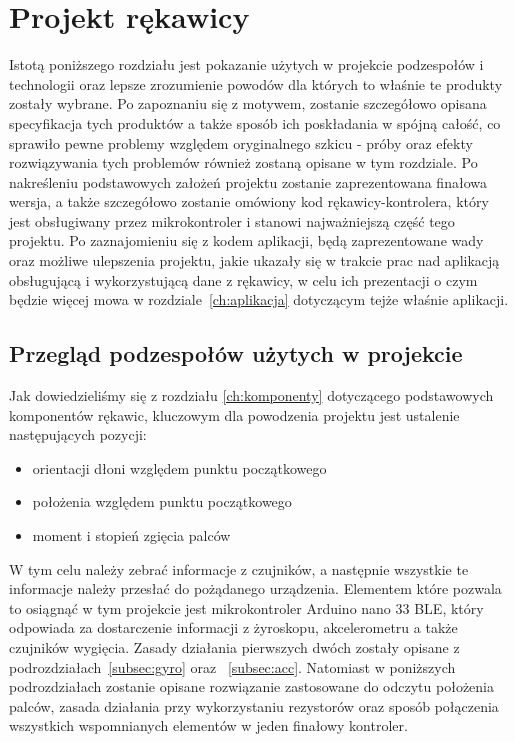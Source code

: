\chapter{Projekt rękawicy}
\label{ch:rekawica}
Istotą poniższego rozdziału jest pokazanie użytych w projekcie podzespołów i technologii oraz lepsze zrozumienie powodów dla których to właśnie te produkty zostały wybrane. Po zapoznaniu się z motywem, zostanie szczegółowo opisana specyfikacja tych produktów a także sposób ich poskładania w spójną całość, co sprawiło pewne problemy względem oryginalnego szkicu - próby oraz efekty rozwiązywania tych problemów również zostaną opisane w tym rozdziale. Po nakreśleniu podstawowych założeń projektu zostanie zaprezentowana finałowa wersja, a także szczegółowo zostanie omówiony kod rękawicy-kontrolera, który jest obsługiwany przez mikrokontroler i stanowi najważniejszą część tego projektu. Po zaznajomieniu się z kodem aplikacji, będą zaprezentowane wady oraz możliwe ulepszenia projektu, jakie ukazały się w trakcie prac nad aplikacją obsługującą i wykorzystującą dane z rękawicy, w celu ich prezentacji o czym będzie więcej mowa w rozdziale~\ref{ch:aplikacja} dotyczącym tejże właśnie aplikacji.

\section{Przegląd podzespołów użytych w projekcie}
\label{sec:przeglad}
Jak dowiedzieliśmy się z rozdziału \ref{ch:komponenty} dotyczącego podstawowych komponentów rękawic, kluczowym dla powodzenia projektu jest ustalenie następujących pozycji: 
\begin{itemize}
\item orientacji dłoni względem punktu początkowego
\item położenia względem punktu początkowego
\item moment i stopień zgięcia palców 
\end{itemize}
 W tym celu należy zebrać informacje z czujników, a następnie wszystkie te informacje należy przesłać do pożądanego urządzenia. Elementem które pozwala to osiągnąć w tym projekcie jest mikrokontroler Arduino nano 33 BLE, który odpowiada za dostarczenie informacji z żyroskopu, akcelerometru a także czujników wygięcia. Zasady działania pierwszych dwóch zostały opisane z podrozdziałach~\ref{subsec:gyro} oraz ~\ref{subsec:acc}. Natomiast w poniższych podrozdziałach zostanie opisane rozwiązanie zastosowane do odczytu położenia palców, zasada działania przy wykorzystaniu rezystorów oraz sposób połączenia wszystkich wspomnianych elementów w jeden finałowy kontroler.
	
